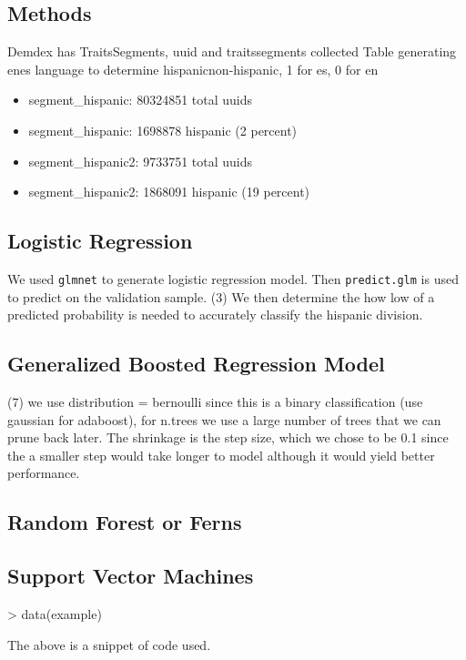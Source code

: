 \documentclass[a4paper]{article}
\begin{document}
\begin{multicols}{2}
\section*{Methods}
Demdex has Traits\/Segments, uuid and traits\/segments collected
Table generating en\/es language to determine hispanic\/non-hispanic, 1 for es, 0 for en
\begin{itemize}
  \item segment\_hispanic: 80324851 total uuids
  \item segment\_hispanic: 1698878 hispanic (2 percent)
  \item segment\_hispanic2: 9733751 total uuids
  \item segment\_hispanic2: 1868091 hispanic (19 percent)
\end{itemize}

\subsection*{Logistic Regression}
We used \texttt{glmnet} to generate logistic regression model.
Then \texttt{predict.glm} is used to predict on the validation sample.
(3) We then determine the how low of a predicted probability is needed to accurately classify the hispanic division.

\subsection*{Generalized Boosted Regression Model}
(7) we use distribution = bernoulli since this is a binary classification (use gaussian for adaboost), for n.trees we use a large number of trees that we can prune back later. The shrinkage is the step size, which we chose to be 0.1 since the a smaller step would take longer to model although it would yield better performance. 
\subsection*{Random Forest or Ferns}

\subsection*{Support Vector Machines}

\begin{Schunk}
\begin{Sinput}
> data(example)
\end{Sinput}
\end{Schunk}
The above is a snippet of code used. 


\end{multicols}
\end{document}

